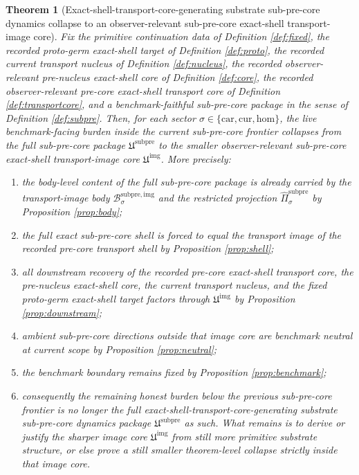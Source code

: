 \documentclass[11pt]{article}
\newcommand{\Car}{\mathrm{car}}
\newcommand{\Cur}{\mathrm{cur}}
\newcommand{\Hom}{\mathrm{hom}}
\newcommand{\SubPreCorePackage}{\mathfrak U^{\mathrm{subpre}}}
\newcommand{\SubPreImageCore}{\mathfrak U^{\mathrm{img}}}
\newcommand{\SubPreImgBody}[1]{\mathcal B_{#1}^{\mathrm{subpre,img}}}
\newcommand{\SubPreImgProj}[1]{\widehat{\Pi}_{#1}^{\mathrm{subpre}}}
\newtheorem{theorem}{Theorem}
\begin{document}
\begin{theorem}[Exact-shell-transport-core-generating substrate sub-pre-core dynamics collapse to an observer-relevant sub-pre-core exact-shell transport-image core]
\label{thm:main}
Fix the primitive continuation data of Definition \ref{def:fixed}, the recorded proto-germ exact-shell target of Definition \ref{def:proto}, the recorded current transport nucleus of Definition \ref{def:nucleus}, the recorded observer-relevant pre-nucleus exact-shell core of Definition \ref{def:core}, the recorded observer-relevant pre-core exact-shell transport core of Definition \ref{def:transportcore}, and a benchmark-faithful sub-pre-core package in the sense of Definition \ref{def:subpre}. Then, for each sector \(\sigma\in\{\Car,\Cur,\Hom\}\), the live benchmark-facing burden inside the current sub-pre-core frontier collapses from the full sub-pre-core package \(\SubPreCorePackage\) to the smaller observer-relevant sub-pre-core exact-shell transport-image core \(\SubPreImageCore\). More precisely:
\begin{enumerate}
    \item the body-level content of the full sub-pre-core package is already carried by the transport-image body \(\SubPreImgBody{\sigma}\) and the restricted projection \(\SubPreImgProj{\sigma}\) by Proposition \ref{prop:body};
    \item the full exact sub-pre-core shell is forced to equal the transport image of the recorded pre-core transport shell by Proposition \ref{prop:shell};
    \item all downstream recovery of the recorded pre-core exact-shell transport core, the pre-nucleus exact-shell core, the current transport nucleus, and the fixed proto-germ exact-shell target factors through \(\SubPreImageCore\) by Proposition \ref{prop:downstream};
    \item ambient sub-pre-core directions outside that image core are benchmark neutral at current scope by Proposition \ref{prop:neutral};
    \item the benchmark boundary remains fixed by Proposition \ref{prop:benchmark};
    \item consequently the remaining honest burden below the previous sub-pre-core frontier is no longer the full exact-shell-transport-core-generating substrate sub-pre-core dynamics package \(\SubPreCorePackage\) as such. What remains is to derive or justify the sharper image core \(\SubPreImageCore\) from still more primitive substrate structure, or else prove a still smaller theorem-level collapse strictly inside that image core.
\end{enumerate}
\end{theorem}
\end{document}
